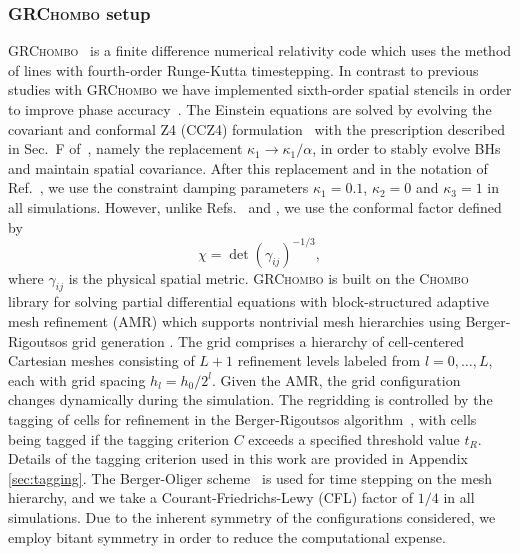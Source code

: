 \documentclass[floats,floatfix,showpacs,amssymb,prd,twocolumn,superscriptaddress,nofootinbib,nolongbibliography,reprint]{revtex4-2}
\newcommand{\mr}[1]{{\textcolor{cyan}{\sf{[MR: #1]}} }}
\newcommand{\rc}[1]{{\textcolor{forestgreen}{\sf{[RC: #1]}} }}
\begin{document}
\subsubsection{\textsc{GRChombo} setup}
\label{sec:grchombo}
\textsc{GRChombo}~\cite{Clough:2015sqa} is a finite difference
numerical relativity code which uses the method of lines with
fourth-order Runge-Kutta timestepping. In contrast to previous studies
with \textsc{GRChombo} we have implemented sixth-order spatial
stencils in order to improve phase accuracy~\cite{Husa:2007hp}. The
Einstein equations are solved by evolving the covariant and conformal
Z4 (CCZ4) formulation~\cite{Alic:2011gg} with the prescription
described in Sec.~F of~\cite{Alic:2013xsa}, namely the replacement
$\kappa_1 \to \kappa_1/\alpha$, in order to stably evolve BHs
and maintain spatial covariance. After this replacement and in the
notation of Ref.~\cite{Alic:2011gg}, we use the constraint damping
parameters $\kappa_1=0.1$, $\kappa_2=0$ and $\kappa_3=1$ in all
simulations.  However, unlike Refs.~\cite{Clough:2015sqa} and
\cite{Alic:2011gg}, we use the conformal factor defined by
\begin{equation}
    \chi = \det(\gamma_{ij})^{-1/3},\label{eq:con-fac}
\end{equation}
where $\gamma_{ij}$ is the physical spatial metric.
\textsc{GRChombo} is built on the \textsc{Chombo}~\cite{ChomboReport} 
library for solving partial differential equations with 
block-structured adaptive mesh refinement (AMR) which supports
nontrivial mesh hierarchies using Berger-Rigoutsos grid generation
\cite{Berger1991}. The grid comprises a hierarchy of cell-centered 
Cartesian meshes consisting of $L+1$ refinement levels labeled from 
$l=0,\ldots,L$, each with grid spacing $h_l=h_0/2^l$. Given the 
AMR, the grid configuration changes dynamically during the simulation.
The regridding is controlled by the tagging of cells for refinement 
in the Berger-Rigoutsos algorithm~\cite{Berger1991}, with cells being 
tagged if the tagging criterion $C$ exceeds a specified threshold 
value $t_R$. Details of the tagging criterion used in this work are 
provided in Appendix \ref{sec:tagging}. The Berger-Oliger scheme~\cite{Berger1991} 
is used for time stepping on the mesh hierarchy, and we take a 
Courant-Friedrichs-Lewy (CFL) factor of $1/4$ in all simulations. 
Due to the inherent symmetry of the configurations considered, we 
employ bitant symmetry in order to reduce the computational expense.
\end{document}
